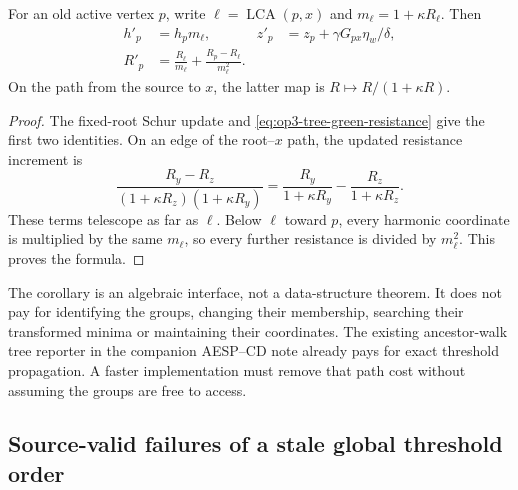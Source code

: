 \begin{corollary}
\label{cor:op3-root-coordinate-update}
For an old active vertex $p$, write
$\ell=\operatorname{LCA}(p,x)$ and $m_\ell=1+\kappa R_\ell$. Then
\begin{align}
 h'_p&=h_pm_\ell,&
 z'_p&=z_p+\gamma G_{px}\eta_w/\delta,\label{eq:op3-root-harmonic-update}\\
 R'_p&=\frac{R_\ell}{m_\ell}
          +\frac{R_p-R_\ell}{m_\ell^2}.
 \label{eq:op3-root-resistance-update}
\end{align}
On the path from the source to $x$, the latter map is
$R\mapsto R/(1+\kappa R)$.
\end{corollary}
\begin{proof}
The fixed-root Schur update and
\cref{eq:op3-tree-green-resistance} give the first two identities.
On an edge of the root--$x$ path, the updated resistance increment is
\[
 \frac{R_y-R_z}{(1+\kappa R_z)(1+\kappa R_y)}
 =\frac{R_y}{1+\kappa R_y}-\frac{R_z}{1+\kappa R_z}.
\]
These terms telescope as far as $\ell$. Below $\ell$ toward $p$, every
harmonic coordinate is multiplied by the same $m_\ell$, so every further
resistance is divided by $m_\ell^2$. This proves the formula.
\end{proof}

The corollary is an algebraic interface, not a data-structure theorem.
It does not pay for identifying the groups, changing their membership,
searching their transformed minima or maintaining their coordinates.
The existing ancestor-walk tree reporter in the companion AESP--CD note
already pays for exact threshold propagation. A faster implementation must
remove that path cost without assuming the groups are free to access.

\subsection{Source-valid failures of a stale global threshold order}

